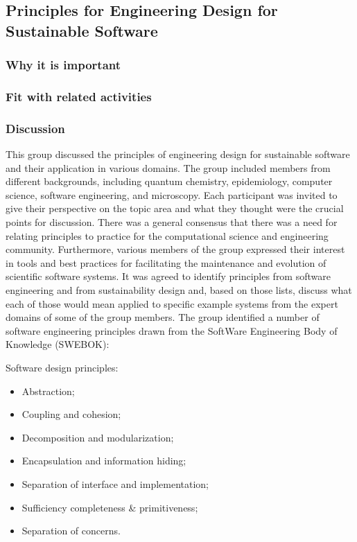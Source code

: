 \subsection{Principles for Engineering Design for Sustainable Software} 

\subsubsection{Why it is important}

\subsubsection{Fit with related activities}

\subsubsection{Discussion}
This group discussed the principles of engineering design for sustainable software and their application in various domains. The group included members from different backgrounds, including quantum chemistry, epidemiology, computer science, software engineering, and microscopy. Each participant was invited to give their perspective on the topic area and what they thought were the crucial points for discussion. There was a general consensus that there was a need for relating principles to practice for the computational science and engineering community. Furthermore, various members of the group expressed their interest in tools and best practices for facilitating the maintenance and evolution of scientific software systems.
It was agreed to identify principles from software engineering and from sustainability design and, based on those lists, discuss what each of those would mean applied to specific example systems from the expert domains of some of the group members. The group identified a number of software engineering principles drawn from the SoftWare Engineering Body of Knowledge (SWEBOK):

Software design principles:
\begin{itemize}
\item Abstraction;
\item Coupling and cohesion;
\item Decomposition and modularization;
\item Encapsulation and information hiding;
\item Separation of interface and implementation;
\item Sufficiency completeness \& primitiveness;
\item Separation of concerns.
\end{itemize}


